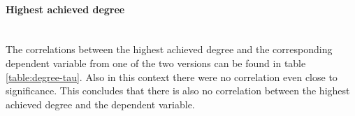 \begin{table}[htb]
  \caption{Correlation between experience with software development and the dependent variables calculated with the \gls{tau} without the subjects that had experience with \gls{see}.}
  \label{table:sd-tau}
  \end{table}

\paragraph{Highest achieved degree}\mbox{}\\
The correlations between the highest achieved degree and the corresponding dependent variable from one of the two versions can be found in table \ref{table:degree-tau}.
Also in this context there were no correlation even close to significance. 
This concludes that there is also no correlation between the highest achieved degree and the dependent variable.

